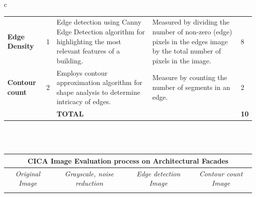 \documentclass[final,5p,times]{elsarticle}
\begin{document}
\begin{table}[!htb]
\begin{tabular}{c}
\begin{minipage}{\textwidth}
\begin{tabularx}{\textwidth}{p{2.5cm} p{1cm} X X p{1cm}}
            \textbf{Edge Density} &
              1 &
              Edge detection using Canny Edge Detection algorithm for highlighting the most relevant features of a building.
                &
              Measured by dividing the number of non-zero (edge) pixels in the edges image by the total number of pixels in the image.
                &
              8\\
            \textbf{Contour count} &
              2 &
              Employs contour approximation algorithm for shape analysis to determine intricacy of edges.
                &
              Measure by counting the number of segments in an edge.
                &
              2\\ \bottomrule
               &
               &
              \textbf{TOTAL} &
              &
              \textbf{10}\\ \bottomrule
        \end{tabularx}
    \end{minipage}
    \\
    \\
    \begin{minipage}{\textwidth}
        \centering
        \label{tab:CICAImageEvalProcessOnArchitecturalFacades}
        \begin{tabularx}
        {\textwidth}{X X X X }
            \toprule
            \multicolumn{4}{c}{\textbf{CICA Image Evaluation process on Architectural Facades}} \\
            \toprule
            \multicolumn{1}{c}{\textit{Original Image}} &
             \multicolumn{1}{c}{\textit{Grayscale, noise reduction}} &
            \multicolumn{1}{c}{\textit{Edge detection Image}} &
            \multicolumn{1}{c}{\textit{Contour count Image}}\\
            \midrule
            \text{(a) 3D-modeled facades} &  &  &
            \\

\end{tabularx}
\end{minipage}
\end{tabular}
\end{table}
\end{document}

